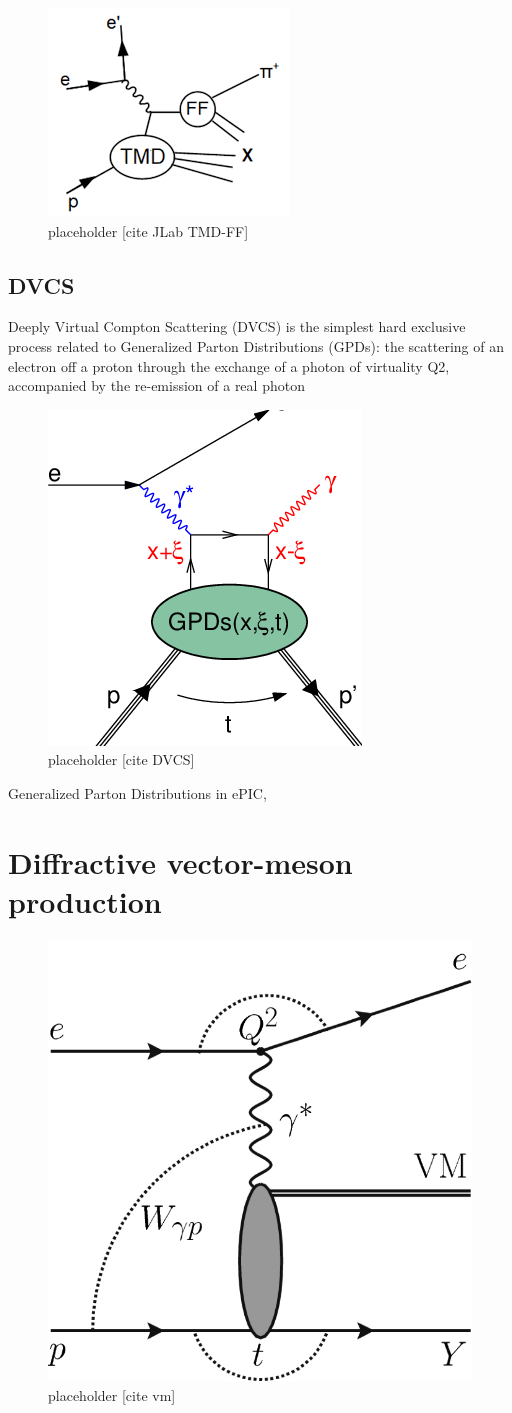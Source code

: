 \begin{figure}[H]
    \centering
    \includegraphics[width=.5\linewidth]{img/TMD_FF.png}
    \caption{placeholder [cite JLab TMD-FF]}
    \label{fig:physics:TMD_FF}
\end{figure}

\subsection{DVCS}
Deeply Virtual Compton Scattering (DVCS) is the simplest hard exclusive process related to Generalized Parton Distributions (GPDs): the scattering of an electron off a proton through the exchange of a photon of virtuality Q2, accompanied by the re-emission of a real photon

\begin{figure}[H]
    \centering
    \includegraphics[width=.5\linewidth]{img/DVCS.png}
    \caption{placeholder [cite DVCS]}
    \label{fig:physics:DVCS}
\end{figure}


Generalized Parton Distributions in ePIC, 

\section{Diffractive vector-meson production}

\begin{figure}[H]
    \centering
    \includegraphics[width=.5\linewidth]{img/vm.png}
    \caption{placeholder [cite vm]}
    \label{fig:physics:VM}
\end{figure}

